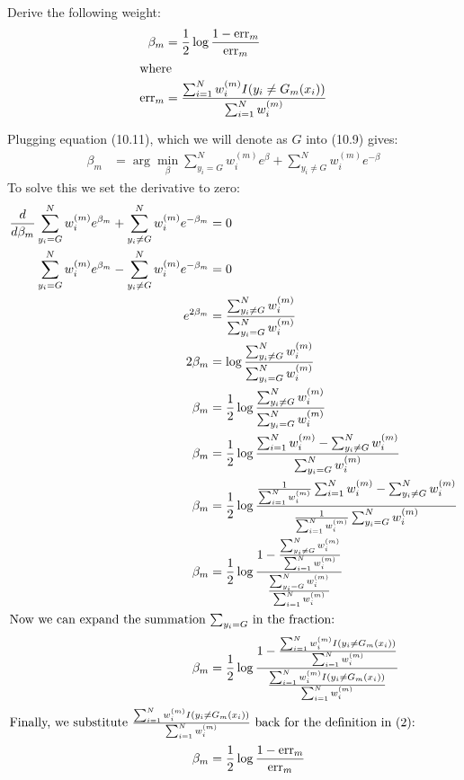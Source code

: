 \documentclass[11pt]{article}
\begin{document}
Derive the following weight:
\begin{align}
	\beta_m &= \frac{1}{2} \log \frac{1-\text{err}_m}{\text{err}_m} \\
	\intertext{where}
	\text{err}_m &= \frac{\sum_{i=1}^N w_i^{(m)} I(y_i \neq G_m(x_i))}{\sum_{i=1}^N w_i^{(m)}}
\end{align}

Plugging equation (10.11), which we will denote as $G$ into (10.9) gives:
\begin{align}
\beta_m &= \arg \min_\beta \sum_{y_i=G}^N w_i^{(m)} e^{\beta} + \sum_{y_i \neq G}^N w_i^{(m)} e^{-\beta}
\end{align}
To solve this we set the derivative to zero:
\begin{align}
\frac{d}{d\beta_m} \sum_{y_i=G}^N w_i^{(m)} e^{\beta_m} + \sum_{y_i \neq G}^N w_i^{(m)} e^{-\beta_m} &= 0\\
\sum_{y_i=G}^N w_i^{(m)} e^{\beta_m} - \sum_{y_i \neq G}^N w_i^{(m)} e^{-\beta_m} &= 0\\
e^{2\beta_m} &= \frac{\sum_{y_i \neq G}^N w_i^{(m)}}{\sum_{y_i=G}^N w_i^{(m)}}\\
2 \beta_m &= \log \frac{\sum_{y_i \neq G}^N w_i^{(m)}}{\sum_{y_i=G}^N w_i^{(m)}}\\
\beta_m &= \frac{1}{2} \log \frac{\sum_{y_i \neq G}^N w_i^{(m)}}{\sum_{y_i=G}^N w_i^{(m)}}\\
\beta_m &= \frac{1}{2} \log \frac{\sum_{i=1}^N w_i^{(m)} - \sum_{y_i \neq G}^N w_i^{(m)}}{\sum_{y_i=G}^N w_i^{(m)}}\\
\beta_m &= \frac{1}{2} \log \frac{\frac{1}{\sum_{i=1}^N w_i^{(m)}} \sum_{i=1}^N w_i^{(m)} - \sum_{y_i \neq G}^N w_i^{(m)}}{\frac{1}{\sum_{i=1}^N w_i^{(m)}} \sum_{y_i=G}^N w_i^{(m)}}\\
\beta_m &= \frac{1}{2} \log \frac{1 - \frac{\sum_{y_i \neq G}^N w_i^{(m)}}{\sum_{i=1}^N w_i^{(m)}}}{\frac{\sum_{y_i=G}^N w_i^{(m)}}{\sum_{i=1}^N w_i^{(m)}}}\\
\intertext{Now we can expand the summation $\sum_{y_i=G}$ in the fraction:}
\beta_m &= \frac{1}{2} \log \frac{1 - \frac{\sum_{i=1}^N w_i^{(m)} I(y_i \neq G_m(x_i))}{\sum_{i=1}^N w_i^{(m)}}}{\frac{\sum_{i=1}^N w_i^{(m)} I(y_i \neq G_m(x_i))}{\sum_{i=1}^N w_i^{(m)}}}\\
\intertext{Finally, we substitute $\frac{\sum_{i=1}^N w_i^{(m)} I(y_i \neq G_m(x_i))}{\sum_{i=1}^N w_i^{(m)}}$ back for the definition in (2):}
\beta_m &= \frac{1}{2} \log \frac{1-\text{err}_m}{\text{err}_m}
\end{align}
\end{document}
